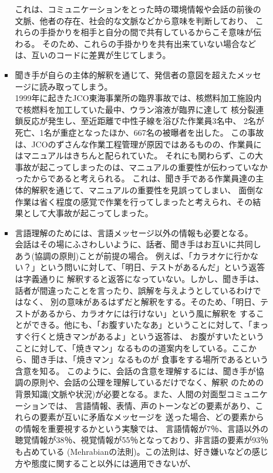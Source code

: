 \documentclass[dvipdfmx]{jsarticle}
\begin{document}
\begin{itemize}
\begin{itemize}
\begin{itemize}
      これは、コミュニケーションをとった時の環境情報や会話の前後の文脈、他者の存在、社会的な文脈などから意味を判断しており、
      これらの手掛かりを相手と自分の間で共有しているからこそ意味が伝わる。
      そのため、これらの手掛かりを共有出来ていない場合などは、互いのコードに差異が生じてしまう。
      \item 聞き手が自らの主体的解釈を通じて、発信者の意図を超えたメッセージに読み取ってしまう。
      \\1999年に起きたJCO東海事業所の臨界事故では、核燃料加工施設内で核燃料を加工していた最中、ウラン溶液が臨界に達して
      核分裂連鎖反応が発生し、至近距離で中性子線を浴びた作業員3名中、
      2名が死亡、1名が重症となったほか、667名の被曝者を出した。
      この事故は、JCOのずさんな作業工程管理が原因ではあるものの、作業員にはマニュアルはきちんと配られていた。
      それにも関わらず、この大事故が起こってしまったのは、マニュアルの重要性が伝わっていなかったからであると考えられる。
      これは、聞き手である作業員達の主体的解釈を通じて、マニュアルの重要性を見誤ってしまい、
      面倒な作業は省く程度の感覚で作業を行ってしまったと考えられ、その結果として大事故が起こってしまった。
      \item 言語理解のためには、言語メッセージ以外の情報も必要となる。
      \\会話はその場にふさわしいように、話者、聞き手はお互いに共同しあう(協調の原則)ことが前提の場合。
      例えば、「カラオケに行かない？」という問いに対して、「明日、テストがあるんだ」という返答は字義通りに
      解釈すると返答になっていない。しかし、聞き手は、話者が間違ったことを言ったり、誤解を与えようとしているわけではなく、
      別の意味があるはずだと解釈をする。そのため、「明日、テストがあるから、カラオケには行けない」という風に解釈を
      することができる。他にも、「お腹すいたなあ」ということに対して、「まっすぐ行くと焼きマンがあるよ」という返答は、
      お腹がすいたということに対して、「焼きマン」なるものの道案内をしている。ここから、聞き手は、「焼きマン」なるものが
      食事をする場所であるという含意を知る。
      このように、会話の含意を理解するには、聞き手が協調の原則や、会話の公理を理解しているだけでなく、解釈
      のための背景知識(文脈や状況)が必要となる。また、人間の対面型コミュニケーションでは、
      言語情報、表情、声のトーンなどの要素があり、これらの要素が互いに矛盾なメッセージを
      送った場合、どの要素からの情報を重要視するかという実験では、
      言語情報が7％、言語以外の聴覚情報が38％、視覚情報が55％となっており、非言語の要素が93％も占めている
      (Mehrabianの法則)。この法則は、好き嫌いなどの感じ方や態度に関すること以外には適用できないが、

\end{itemize}
\end{itemize}
\end{itemize}
\end{document}

